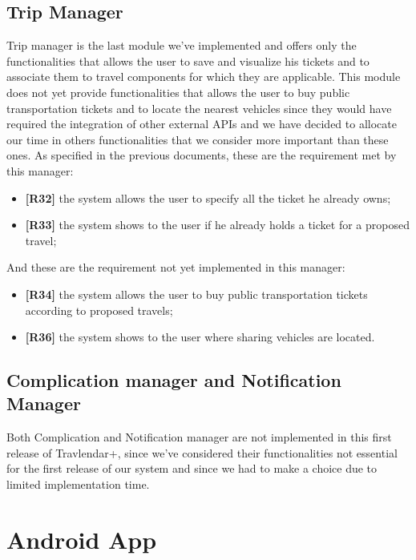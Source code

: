 \subsection{Trip Manager}
Trip manager is the last module we've implemented and offers only the functionalities that allows the user to save and visualize his tickets and to associate them to travel components for which they are applicable.
This module does not yet provide functionalities that allows the user to buy public transportation tickets and to locate the nearest vehicles since they would have required the integration of other external APIs and we have decided to allocate our time in others functionalities that we consider more important than these ones.
As specified in the previous documents, these are the requirement met by this manager:
\begin{itemize}
	\item \textbf{[R32]} the system allows the user to specify all the ticket he already owns;
	\item \textbf{[R33]} the system shows to the user if he already holds a ticket for a proposed travel;
\end{itemize}
And these are the requirement not yet implemented in this manager:
\begin{itemize}
	\item \textbf{[R34]} the system allows the user to buy public transportation tickets according to proposed travels;
	\item \textbf{[R36]} the system shows to the user where sharing vehicles are located.
\end{itemize}

\subsection{Complication manager and Notification Manager}
Both Complication and Notification manager are not implemented in this first release of Travlendar+, since we've considered their functionalities not essential for the  first release of our system and since we had to make a choice due to limited implementation time. 
\section{Android App}
\label{sec:AndroidApp}
